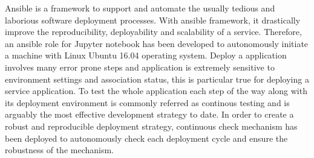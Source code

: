 Ansible is a framework to support and automate the usually tedious and laborious software deployment processes. With ansible framework, it drastically improve the reproducibility, deployability and scalability of a service. Therefore, 
an ansible role for Jupyter notebook has been developed to autonomously initiate a machine with Linux Ubuntu 16.04 operating system. 
Deploy a application involves many error prone steps and application is extremely sensitive to environment settings and association status, this is particular true for deploying a service application. To test the whole application each step of the way along with its deployment environment is commonly referred as continous testing and is arguably the most effective development strategy to date. In order to create a robust and reproducible deployment strategy, continuous check mechanism has been deployed to autonomously check each deployment cycle and ensure the robustness of the mechanism. 